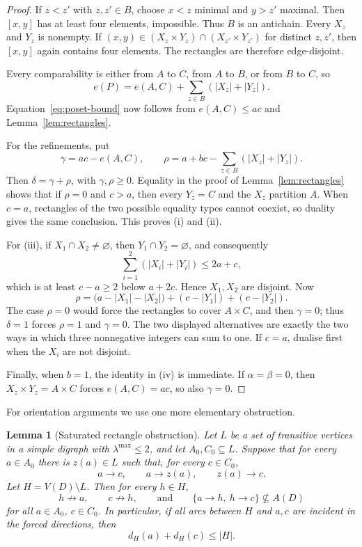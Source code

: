 \documentclass[11pt]{amsart}
\newtheorem{lemma}[theorem]{Lemma}
\theoremstyle{definition}
\newcommand{\lamax}{\lambda^{\max}}
\begin{document}
\begin{proof}
If $z<z'$ with $z,z'\in B$, choose $x<z$ minimal and $y>z'$ maximal.
Then $[x,y]$ has at least four elements, impossible.  Thus $B$ is an
antichain.  Every $X_z$ and $Y_z$ is nonempty.  If
$(x,y)\in(X_z\times Y_z)\cap(X_{z'}\times Y_{z'})$ for distinct $z,z'$,
then $[x,y]$ again contains four elements.  The rectangles are therefore
edge-disjoint.

Every comparability is either from $A$ to $C$, from $A$ to $B$, or from
$B$ to $C$, so
\[
 e(P)=e(A,C)+\sum_{z\in B}(|X_z|+|Y_z|).
\]
Equation~\eqref{eq:poset-bound} now follows from
$e(A,C)\le ac$ and Lemma~\ref{lem:rectangles}.

For the refinements, put
\[
 \gamma=ac-e(A,C),
 \qquad
 \rho=a+bc-\sum_{z\in B}(|X_z|+|Y_z|).
\]
Then $\delta=\gamma+\rho$, with $\gamma,\rho\ge0$.
Equality in the proof of Lemma~\ref{lem:rectangles} shows that if
$\rho=0$ and $c>a$, then every $Y_z=C$ and the $X_z$ partition $A$.
When $c=a$, rectangles of the two possible equality types cannot coexist,
so duality gives the same conclusion.  This proves (i) and (ii).

For (iii), if $X_1\cap X_2\ne\varnothing$, then
$Y_1\cap Y_2=\varnothing$, and consequently
\[
 \sum_{i=1}^2(|X_i|+|Y_i|)\le2a+c,
\]
which is at least $c-a\ge2$ below $a+2c$.  Hence $X_1,X_2$ are disjoint.
Now
\[
 \rho=\bigl(a-|X_1|-|X_2|\bigr)
       +(c-|Y_1|)+(c-|Y_2|).
\]
The case $\rho=0$ would force the rectangles to cover $A\times C$, and
then $\gamma=0$; thus $\delta=1$ forces $\rho=1$ and $\gamma=0$.
The two displayed alternatives are exactly the two ways in which three
nonnegative integers can sum to one.  If $c=a$, dualise first when the
$X_i$ are not disjoint.

Finally, when $b=1$, the identity in (iv) is immediate.  If
$\alpha=\beta=0$, then $X_z\times Y_z=A\times C$ forces
$e(A,C)=ac$, so also $\gamma=0$.
\end{proof}

For orientation arguments we use one more elementary obstruction.

\begin{lemma}[Saturated rectangle obstruction]\label{lem:saturated}
Let $L$ be a set of transitive vertices in a simple digraph with
$\lamax\le2$, and let $A_0,C_0\subseteq L$.  Suppose that for every
$a\in A_0$ there is $z(a)\in L$ such that, for every $c\in C_0$,
\[
 a\to c,
 \qquad a\to z(a),
 \qquad z(a)\to c.
 \tag{\(**\)}\label{eq:saturated}
\]
Let $H=V(D)\setminus L$.  Then for every $h\in H$,
\[
 h\not\to a,\qquad c\not\to h,
 \qquad\text{and}\qquad
 \{a\to h,\ h\to c\}\not\subseteq A(D)
\]
for all $a\in A_0$, $c\in C_0$.  In particular, if all arcs between
$H$ and $a,c$ are incident in the forced directions, then
\begin{equation}\label{eq:external-sum}
 d_H(a)+d_H(c)\le |H|.
\end{equation}
\end{lemma}
\end{document}
